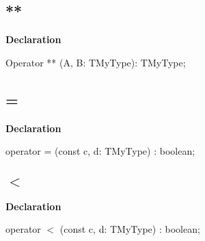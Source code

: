 \documentclass{report}
\begin{document}
\subsection*{**}
\begin{list}{}{
\setlength{\itemindent}{0cm}
\setlength{\listparindent}{0cm}
\setlength{\leftmargin}{\evensidemargin}
\addtolength{\leftmargin}{\tmplength}
\settowidth{\labelsep}{X}
\addtolength{\leftmargin}{\labelsep}
\setlength{\labelwidth}{\tmplength}
}
\begin{flushleft}
\item[\textbf{Declaration}\hfill]
\begin{ttfamily}
Operator ** (A, B: TMyType): TMyType;\end{ttfamily}


\end{flushleft}
\end{list}
\subsection*{=}
\begin{list}{}{
\setlength{\itemindent}{0cm}
\setlength{\listparindent}{0cm}
\setlength{\leftmargin}{\evensidemargin}
\addtolength{\leftmargin}{\tmplength}
\settowidth{\labelsep}{X}
\addtolength{\leftmargin}{\labelsep}
\setlength{\labelwidth}{\tmplength}
}
\begin{flushleft}
\item[\textbf{Declaration}\hfill]
\begin{ttfamily}
operator = (const c, d: TMyType) : boolean;\end{ttfamily}


\end{flushleft}
\end{list}
\subsection*{{$<$}}
\begin{list}{}{
\setlength{\itemindent}{0cm}
\setlength{\listparindent}{0cm}
\setlength{\leftmargin}{\evensidemargin}
\addtolength{\leftmargin}{\tmplength}
\settowidth{\labelsep}{X}
\addtolength{\leftmargin}{\labelsep}
\setlength{\labelwidth}{\tmplength}
}
\begin{flushleft}
\item[\textbf{Declaration}\hfill]
\begin{ttfamily}
operator {$<$} (const c, d: TMyType) : boolean;\end{ttfamily}


\end{flushleft}
\end{list}
\end{document}
